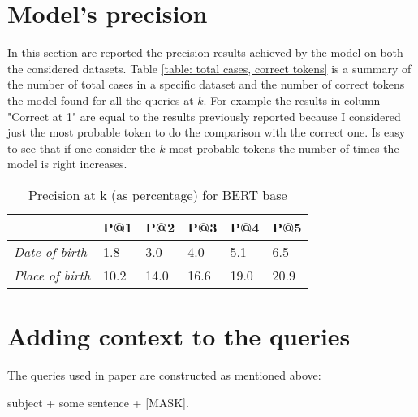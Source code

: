 \documentclass{article}
\begin{document}
\section{Model's precision}
In this section are reported the precision results achieved by the model on both the considered datasets. Table \ref{table: total cases, correct tokens} is a summary of the number of total cases in a specific dataset and the number of correct tokens the model found for all the queries at $k$. For example the results in column "Correct at 1" are equal to the results previously reported because I considered just the most probable token to do the comparison with the correct one. Is easy to see that if one consider the $k$ most probable tokens the number of times the model is right increases. 

\begin{table}[ht!]
\centering
{}
\caption{Total number of cases for each dataset and corresponding correct predictions at $k$}
\label{table: total cases, correct tokens}
\end{table}

\begin{table}[h!]
\centering
\begin{tabular}{l|l|l|l|l|l|}
\cline{2-6}
                          & P@1   & P@2   & P@3   & P@4   & P@5   \\ \hline
\multicolumn{1}{|l|}{\textit{Date of birth}} & 1.8 & 3.0 & 4.0 & 5.1 & 6.5 \\ \hline
\multicolumn{1}{|l|}{\textit{Place of birth}} & 10.2   & 14.0   & 16.6  & 19.0  & 20.9  \\ \hline
\end{tabular}
\caption{Precision at k (as percentage) for BERT base}
\end{table}

\section{Adding context to the queries}
The queries used in paper \cite{petroni2019language} are constructed as mentioned above:
\begin{center}
subject + some sentence + [MASK].
\end{center}
\end{document}
